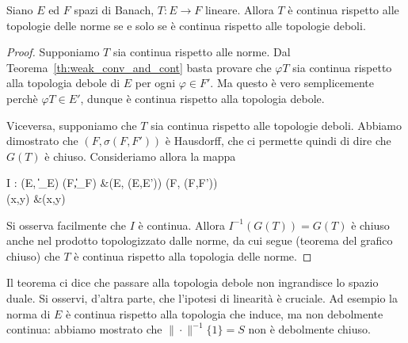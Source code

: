 \begin{theorem}
	Siano $E$ ed $F$ spazi di Banach, $T : E \to F$ lineare. Allora $T$ è continua rispetto alle topologie delle norme se e solo se è continua rispetto alle topologie deboli.
\end{theorem}
\begin{proof}
	Supponiamo $T$ sia continua rispetto alle norme. Dal Teorema~\ref{th:weak_conv_and_cont} basta provare che $\varphi T$ sia continua rispetto alla topologia debole di $E$ per ogni $\varphi \in F'$. Ma questo è vero semplicemente perchè $\varphi T \in E'$, dunque è continua rispetto alla topologia debole.

	Viceversa, supponiamo che $T$ sia continua rispetto alle topologie deboli. Abbiamo dimostrato che $(F, \sigma(F,F'))$ è Hausdorff, che ci permette quindi di dire che $G(T)$ è chiuso. Consideriamo allora la mappa
	\begin{eqalign*}
		I : (E, \|\cdot\|_E) \times (F,\|\cdot\|_F) &\longto (E, \sigma(E,E')) \times (F, \sigma(F,F'))\\
			(x,y) &\longmapsto (x,y)
	\end{eqalign*}
	Si osserva facilmente che $I$ è continua. Allora $I^{-1}(G(T)) = G(T)$ è chiuso anche nel prodotto topologizzato dalle norme, da cui segue (teorema del grafico chiuso) che $T$ è continua rispetto alla topologia delle norme.
\end{proof}

\begin{remark}
	Il teorema ci dice che passare alla topologia debole non ingrandisce lo spazio duale. Si osservi, d'altra parte, che l'ipotesi di linearità è cruciale. Ad esempio la norma di $E$ è continua rispetto alla topologia che induce, ma non debolmente continua: abbiamo mostrato che $\|\cdot\|^{-1}\{1\} = S$ non è debolmente chiuso.
\end{remark}

